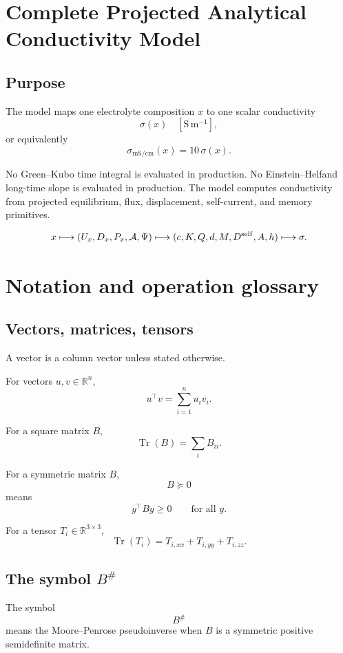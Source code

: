 \documentclass[11pt]{article}
\newcommand{\R}{\mathbb R}
\newcommand{\Tr}{\operatorname{Tr}}
\begin{document}
  \section*{Complete Projected Analytical Conductivity Model}

  \subsection*{Purpose}

  The model maps one electrolyte composition \(x\) to one scalar conductivity
  \[
  \sigma(x)\quad [\mathrm{S\,m^{-1}}],
  \]
  or equivalently
  \[
  \sigma_{\mathrm{mS/cm}}(x)=10\,\sigma(x).
  \]

  No Green--Kubo time integral is evaluated in production.
  No Einstein--Helfand long-time slope is evaluated in production.
  The model computes conductivity from projected equilibrium, flux, displacement,
  self-current, and memory primitives.

  \[
  x
  \longmapsto
  (U_x,D_x,P_x,\mathcal A,\Psi)
  \longmapsto
  (c,K,Q,d,M,D^{\rm self},A,h)
  \longmapsto
  \sigma.
  \]

  \section{Notation and operation glossary}

  \subsection{Vectors, matrices, tensors}

  A vector is a column vector unless stated otherwise.

  For vectors \(u,v\in\R^n\),
  \[
  u^\top v=\sum_{i=1}^n u_i v_i.
  \]

  For a square matrix \(B\),
  \[
  \Tr(B)=\sum_i B_{ii}.
  \]

  For a symmetric matrix \(B\),
  \[
  B\succeq0
  \]
  means
  \[
  y^\top B y\ge0
  \qquad
  \text{for all }y.
  \]

  For a tensor \(T_i\in\R^{3\times3}\),
  \[
  \Tr(T_i)=T_{i,xx}+T_{i,yy}+T_{i,zz}.
  \]

  \subsection{The symbol \(B^\#\)}

  The symbol
  \[
  B^\#
  \]
  means the Moore--Penrose pseudoinverse when \(B\) is a symmetric positive
  semidefinite matrix.
\end{document}
